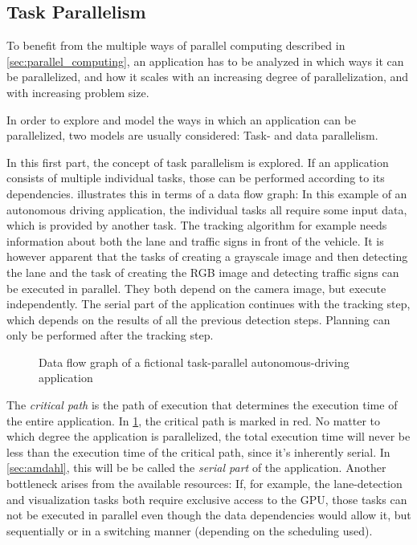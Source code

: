 \documentclass[BCOR20mm,DIV14,10pt,headinclude,footexclude,bibtotoc,liststotoc]{article}
\begin{document}
\subsection{Task Parallelism}
\label{sec:task_parallel}
To benefit from the multiple ways of parallel computing described in
\cref{sec:parallel_computing}, an application has to be analyzed in which ways
it can be parallelized, and how it scales with an increasing degree of
parallelization, and with increasing problem size.

In order to explore and model the ways in which an application can be
parallelized, two models are usually considered: Task- and data parallelism.

In this first part, the concept of task parallelism is explored. If an
application consists of multiple individual tasks, those can be performed
according to its dependencies.  illustrates this in terms
of a data flow graph: In this example of an autonomous driving application, the
individual tasks all require some input data, which is provided by another task.
The tracking algorithm for example needs information about both the lane and
traffic signs in front of the vehicle. It is however apparent that the tasks of
creating a grayscale image and then detecting the lane and the task of creating
the RGB image and detecting traffic signs can be executed in parallel. They both
depend on the camera image, but execute independently. The serial part of the
application continues with the tracking step, which depends on the results of
all the previous detection steps. Planning can only be performed after the
tracking step.

\begin{figure}
	\centering
	
	\caption{Data flow graph of a fictional task-parallel autonomous-driving application}
	\label{fig:task_graph}
\end{figure}

The \emph{critical path} is the path of execution that determines the execution
time of the entire application. In \cref{fig:task_graph}, the critical path is
marked in red. No matter to which degree the application is parallelized, the
total execution time will never be less than the execution time of the critical
path, since it's inherently serial. In \cref{sec:amdahl}, this will be be called
the \emph{serial part} of the application. Another bottleneck arises from the
available resources: If, for example, the lane-detection and visualization tasks
both require exclusive access to the GPU, those tasks can not be executed in
parallel even though the data dependencies would allow it, but sequentially or
in a switching manner (depending on the scheduling used).
\end{document}
